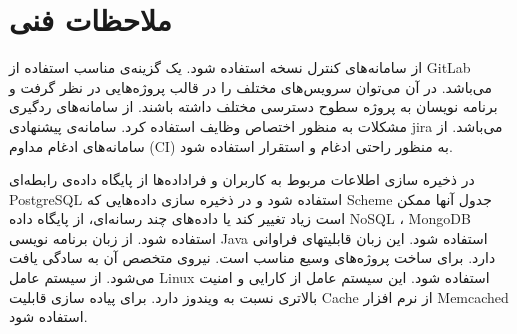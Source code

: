 \section{ملاحظات فنی}
\begin{itemize}
 از سامانه‌های کنترل نسخه استفاده شود. یک گزینه‌ی مناسب استفاده از GitLab می‌باشد. در آن می‌توان سرویس‌های مختلف را در قالب پروژه‌هایی در نظر گرفت و برنامه نویسان به پروژه سطوح دسترسی مختلف داشته باشند. 
 از سامانه‌های ردگیری مشکلات به منظور اختصاص وظایف استفاده کرد. سامانه‌ی پیشنهادی jira می‌باشد.
 از سامانه‌های ادغام مداوم (CI)   به منظور راحتی ادغام و استقرار استفاده شود. 
\end{itemize}
\begin{itemize}


 در ذخیره سازی اطلاعات مربوط به کاربران  و فراداده‌ها از پایگاه داده‌ی رابطه‌ای  PostgreSQL استفاده شود و در ذخیره سازی داده‌هایی که Scheme جدول آنها ممکن است زیاد تغییر کند یا داده‌های چند رسانه‌ای، از پایگاه داده NoSQL ، MongoDB استفاده شود. 
 از زبان برنامه نویسی Java استفاده شود. این زبان قابلیتهای فراوانی دارد. برای ساخت پروژه‌های وسیع مناسب است. نیروی متخصص آن به سادگی یافت می‌شود. 
 از سیستم عامل Linux استفاده شود. این سیستم عامل از کارایی و امنیت بالاتری نسبت به ویندوز دارد. 
 برای پیاده‌ سازی قابلیت Cache از نرم افزار  Memcached استفاده شود.
\end{itemize}
